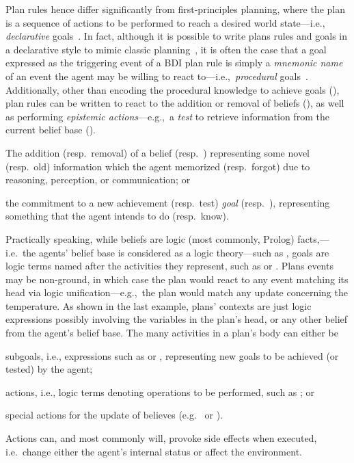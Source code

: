 \documentclass[12pt,a4paper,openright,twoside]{book}
\begin{document}
Plan rules hence differ significantly from first-principles planning, where the plan is a sequence of actions to be performed to reach a desired world state---i.e., \emph{declarative} goals~\cite{winikoff2002kr}.
%
In fact, although it is possible to write plans rules and goals in a declarative style to mimic classic planning~\cite{hubner2006dalt, HindriksBHM00}, it is often the case that a goal expressed as the triggering event of a \ac{BDI} plan rule is simply a \emph{mnemonic name} of an event the agent may be willing to react to---i.e.,\ \emph{procedural} goals~\cite{winikoff2002kr}.
%
Additionally, other than encoding the procedural knowledge to achieve goals (),
\agentspeak{} plan rules can be written to react to the addition or removal of beliefs (), as well as performing \emph{epistemic actions}---e.g.,\ a \emph{test} to retrieve information from the current belief base ().
%
\begin{inlinelist}
    \item The addition (resp.\ removal) of a belief  (resp.\ )
    representing some novel (resp.\ old) information which the agent memorized (resp.\ forgot)
    due to reasoning, perception, or communication; or
    \item the commitment to a new achievement (resp.\ test) \emph{goal}  (resp.\ ),
    representing something that the agent intends to do (resp.\ know).
\end{inlinelist}
%
Practically speaking, while beliefs are logic (most commonly, Prolog) facts,---i.e.\ the agents' belief base is considered as a logic theory---such as , goals are logic terms named after the activities they represent, such as  or .
%
Plans events may be non-ground, in which case the plan would react to any event matching its head via logic unification---e.g.,\ the plan  would match any update concerning the temperature.
%
As shown in the last example, plans' contexts are just logic expressions possibly involving
the variables in the plan's head, or any other belief from the agent's belief base.
%
The many activities in a plan's body can either be
%
\begin{inlinelist}
    \item subgoals, i.e., expressions such as  or ,
    representing new goals to be achieved (or tested) by the agent;
    \item actions, i.e., logic terms denoting operations to be performed,
    such as ; or
    \item special actions for the update of believes (e.g.\  or ). \end{inlinelist}
%
Actions can, and most commonly will, provoke side effects when executed, i.e.\ change either the agent's internal status or affect the environment.
\end{document}
